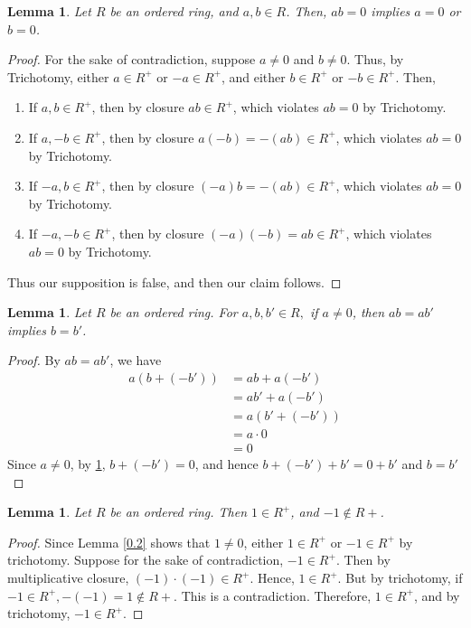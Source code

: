 \documentclass{article}
\newcommand{\FTSOC}{For the sake of contradiction}
\newcommand{\SFTSOC}{Suppose for the sake of contradiction}
\newtheorem{lem}[thm]{Lemma}
\begin{document}
\begin{lem}
\label{0.6}
Let $R$ be an ordered ring, and $a,b\in R$. Then, $ab=0$ implies $a=0$ or $b=0$.
\end{lem}
\begin{proof}
\FTSOC, suppose $a\neq 0$ and $b\neq 0$. Thus, by Trichotomy, either $a\in R^{+}$ or $-a\in R^{+}$, and either $b\in R^{+}$ or $-b\in R^{+}$. Then, 
\begin{enumerate}
    \item If $a,b\in R^{+}$, then by closure $ab \in R^{+}$, which violates $ab=0$ by Trichotomy. 
    \item If $a,-b\in R^{+}$, then by closure $a(-b)=-(ab) \in R^{+}$, which violates $ab=0$ by Trichotomy. 
    \item If $-a,b\in R^{+}$, then by closure $(-a)b=-(ab) \in R^{+}$, which violates $ab=0$ by Trichotomy. 
    \item If $-a,-b\in R^{+}$, then by closure $(-a)(-b)=ab \in R^{+}$, which violates $ab=0$ by Trichotomy. 
\end{enumerate}
Thus our supposition is false, and then our claim follows. 
\end{proof}

\begin{lem}
\label{0.6.1}
Let $R$ be an ordered ring. For $a,b,b'\in R,$ if $a\neq 0$, then $ab=ab'$ implies $b=b'$.
\end{lem}
\begin{proof}
By $ab=ab'$, we have 
\begin{equation}
    \begin{split}
        a(b+(-b'))&= ab+a(-b')\\
        &= ab'+a(-b')\\
        &= a(b'+(-b'))\\
        &= a\cdot 0\\
        &= 0
    \end{split}
\end{equation}
Since $a\neq 0$, by \ref{0.6}, $b+(-b')=0$, and hence $b+(-b')+b'=0+b'$ and $b=b'$
\end{proof}


\begin{lem}
\label{0.7}
Let $R$ be an ordered ring. Then $1 \in R^{+}$, and $-1 \not\in R+$.
\end{lem}
\begin{proof}
Since Lemma \ref{0.2} shows that $1 \neq 0$, either $1\in R^+$ or $-1 \in R^+$ by trichotomy. \SFTSOC, $-1 \in R^+$. Then by multiplicative closure, $(-1) \cdot (-1) \in R^+$. Hence, $1 \in R^+$. But by trichotomy, if $-1 \in R^+, -(-1)=1 \not\in R+$. This is a contradiction. Therefore, $1 \in R^+$, and by trichotomy, $-1 \in R^+$.
\end{proof}
\end{document}
